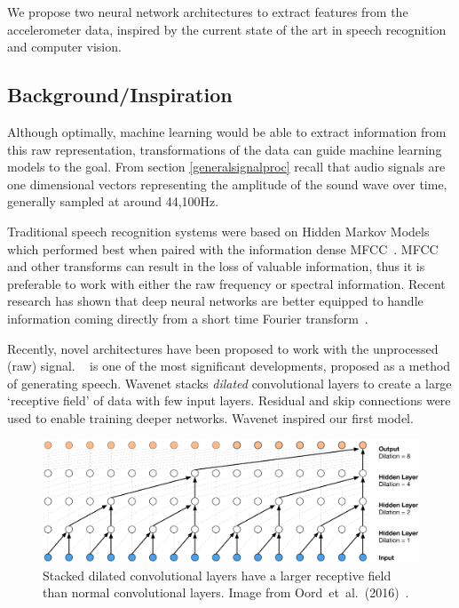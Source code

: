\documentclass[12pt, twoside]{book}
\renewcommand\emph[1]{\textit{\color{USred}{#1}}}
\begin{document}
We propose two neural network architectures to extract features from the accelerometer data, inspired by the current state of the art in speech recognition and computer vision. 

\subsection{Background/Inspiration}
Although optimally, machine learning would be able to extract information from this raw representation, transformations of the data can guide machine learning models to the goal. From section \ref{generalsignalproc} recall that audio signals are one dimensional vectors representing the amplitude of the sound wave over time, generally sampled at around 44,100Hz. 

Traditional speech recognition systems were based on Hidden Markov Models which performed best when paired with the information dense MFCC~\cite{hinton2012speech}. MFCC and other transforms can result in the loss of valuable information, thus it is preferable to work with either the raw frequency or spectral information. Recent research has shown that deep neural networks are better equipped to handle information coming directly from a short time Fourier transform~\cite{microsoftspeech}. 

Recently, novel architectures have been proposed to work with the unprocessed (raw) signal. \emph{Wavenet}~\cite{wavenet} is one of the most significant developments, proposed as a method of generating speech. Wavenet stacks \textit{dilated} convolutional layers to create a large `receptive field' of data with few input layers. Residual and skip connections were used to enable training deeper networks. Wavenet inspired our first model.


\begin{figure}[h]
	\label{wavenet}
	\centering\centerline{\includegraphics[width=1\linewidth]{wavenet.png}}
	\caption{Stacked dilated convolutional layers have a larger receptive field than normal convolutional layers. Image from Oord~et~al.~(2016)~\cite{wavenet}.}
\end{figure}
\end{document}
